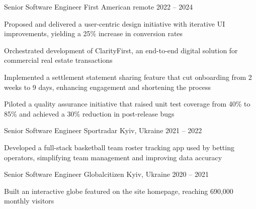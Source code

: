 \begin{cventries}
\entryskip
  \cventry
    {Senior Software Engineer} %
    {First American} %
    {remote} %
    {2022 -- 2024} %
     {
     	\begin{cvitems} %
     		\item {Proposed and delivered a user-centric design initiative with iterative UI improvements, yielding a 25\% increase in conversion rates}
     		\item {Orchestrated development of ClarityFirst, an end-to-end digital solution for commercial real estate transactions}
	    	\item {Implemented a settlement statement sharing feature that cut onboarding from 2 weeks to 9 days, enhancing engagement and shortening the process}
	    	\item {Piloted a quality assurance initiative that raised unit test coverage from 40\% to 85\% and achieved a 30\% reduction in post-release bugs}
	    \end{cvitems}
    }

\entryskip
  \cventry
    {Senior Software Engineer} %
    {Sportradar} %
    {Kyiv, Ukraine} %
    {2021 -- 2022} %
    {
      \begin{cvitems} %
       \item {Developed a full-stack basketball team roster tracking app used by betting operators, simplifying team management and improving data accuracy}
      \end{cvitems}
    }

\entryskip
  \cventry
    {Senior Software Engineer} %
    {Globalcitizen} %
    {Kyiv, Ukraine} %
    {2020 -- 2021} %
    {
      \begin{cvitems} %
       \item {Built an interactive globe featured on the site homepage, reaching 690,000 monthly visitors}
      \end{cvitems}
    }


\end{cventries}
